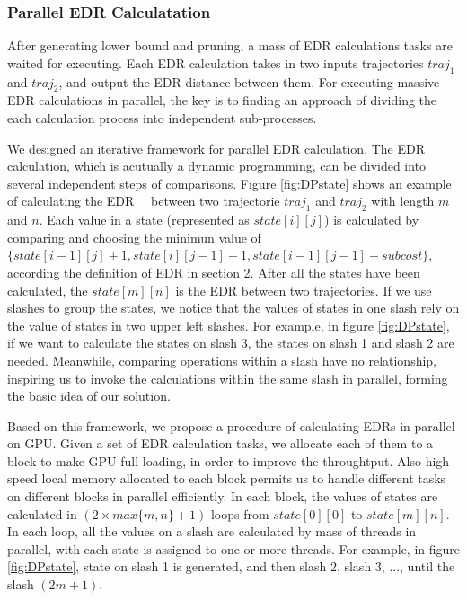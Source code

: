 \documentclass[conference]{IEEEtran}
\begin{document}
\subsubsection{Parallel EDR Calculatation}
After generating lower bound and pruning, a mass of EDR calculations tasks are waited for executing. Each EDR calculation takes in two inputs trajectories $traj_1$ and $traj_2$, and output the EDR distance between them. For executing massive EDR calculations in parallel, the key is to finding an approach of dividing the each calculation process into independent sub-processes.  

We designed an iterative framework for parallel EDR calculation. The EDR calculation, which is acutually a dynamic programming, can be divided into several independent steps of comparisons. Figure \ref{fig:DPstate} shows an example of calculating the EDR 　between two trajectorie $traj_1$ and $traj_2$ with length $m$ and $n$. Each value in a state (represented as $state[i][j]$) is calculated by comparing and choosing the minimun value of $\{state[i-1][j]+1,state[i][j-1]+1,state[i-1][j-1]+subcost\}$, according the definition of EDR in section 2. After all the states have been calculated, the $state[m][n]$ is the EDR between two trajectories. If we use slashes to group the states, we notice that the values of states in one slash rely on the value of states in two upper left slashes. For example, in figure \ref{fig:DPstate}, if we want to calculate the states on slash 3, the states on slash 1 and slash 2 are needed. Meanwhile, comparing operations within a slash have no relationship, inspiring us to invoke the calculations within the same slash in parallel, forming the basic idea of our solution.

Based on this framework, we propose a procedure of calculating EDRs in parallel on GPU. Given a set of EDR calculation tasks, we allocate each of them to a block to make GPU full-loading, in order to improve the throughtput. Also high-speed local memory allocated to each block permits us to handle different tasks on different blocks in parallel efficiently. In each block, the values of states are calculated in $(2\times max\{m,n\}+1)$ loops from $state[0][0]$ to $state[m][n]$. In each loop, all the values on a slash are calculated by mass of threads in parallel, with each state is assigned to one or more threads. For example, in figure \ref{fig:DPstate}, state on slash 1 is generated, and then slash 2, slash 3, ..., until the slash $(2m+1)$. 
\end{document}

